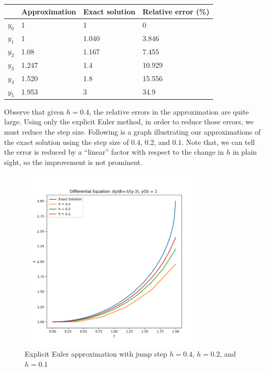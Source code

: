 \documentclass[a4paper]{article}
\begin{document}
\begin{table}[H]
  \centering
  \begin{tabular}{|l|l|l|l|}
    \hline
            & Approximation & Exact solution & Relative error (\%) \\
    \hline
    \(y_0\) & 1             & 1              & 0                   \\
    \hline
    \(y_1\) & 1             & 1.040          & 3.846               \\
    \hline
    \(y_2\) & 1.08          & 1.167          & 7.455               \\
    \hline
    \(y_3\) & 1.247         & 1.4            & 10.929              \\
    \hline
    \(y_4\) & 1.520         & 1.8            & 15.556              \\
    \hline
    \(y_5\) & 1.953         & 3              & 34.9                \\
    \hline
  \end{tabular}
\end{table}

Observe that given \(h = 0.4\), the relative errors in the approximation are quite large. Using only the explicit Euler method, in order to reduce those errors, we must reduce the step size. Following is a graph illustrating our approximations of the exact solution using the step size of \(0.4\), \(0.2\), and \(0.1\). Note that, we can tell the error is reduced by a ``linear'' factor with respect to the change in \(h\) in plain sight, so the improvement is not prominent.

\begin{figure}[H]
  \centering
  \includegraphics[width=0.8\textwidth]{plot_euler.png}
  \caption{Explicit Euler approximation with jump step \(h = 0.4\), \(h = 0.2\), and \(h = 0.1\)}
\end{figure}
\end{document}
